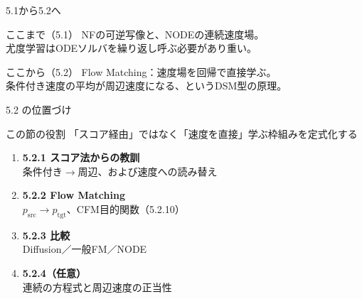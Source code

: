 

\begin{frame}{5.1から5.2へ}
    \begin{block}{ここまで（5.1）}
        NFの可逆写像と、NODEの連続速度場。\\
        尤度学習はODEソルバを繰り返し呼ぶ必要があり重い。
    \end{block}
    \begin{block}{ここから（5.2）}
        Flow Matching：速度場を回帰で直接学ぶ。\\
        条件付き速度の平均が周辺速度になる、というDSM型の原理。
    \end{block}
\end{frame}
\asmain
\begin{frame}{5.2 の位置づけ}
    \begin{block}{この節の役割}
        「スコア経由」ではなく「速度を直接」学ぶ枠組みを定式化する
    \end{block}
    \begin{enumerate}
        \item \textbf{5.2.1 スコア法からの教訓}\\
        条件付き$\to$周辺、および速度への読み替え
        \item \textbf{5.2.2 Flow Matching}\\
        $p_{\mathrm{src}}\to p_{\mathrm{tgt}}$、CFM目的関数（5.2.10）
        \item \textbf{5.2.3 比較}\\
        Diffusion／一般FM／NODE
        \item \textbf{5.2.4（任意）}\\
        連続の方程式と周辺速度の正当性
    \end{enumerate}
\end{frame}

